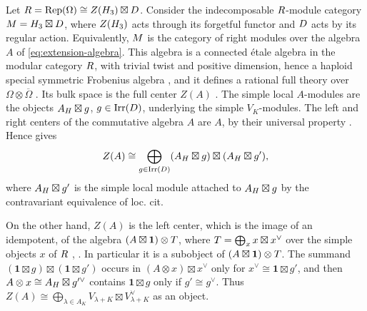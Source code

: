\documentclass[leqno]{article}
\let\cal\relax
\newcommand{\cal}{\mathcal}
\newcommand{\ot}{\otimes}
\DeclareMathOperator{\Irr}{Irr}
\DeclareMathOperator{\Rep}{Rep}
\numberwithin{equation}{section}
\begin{document}
Let $\cal R = \Rep(\Omega) \cong Z(\cal H_3) \boxtimes \cal D$. Consider the indecomposable $\cal R$-module category $\cal M = \cal H_3 \boxtimes \cal D$, where $Z(\cal H_3)$ acts through its forgetful functor \cite[Proposition 2.2(1) p.~10]{Arh26b} and $\cal D$ acts by its regular action. Equivalently, $\cal M$ is the category of right modules over the algebra $A$ of \eqref{eq:extension-algebra}. This algebra is a connected étale algebra in the modular category $\cal R$, with trivial twist and positive dimension, hence a haploid special symmetric Frobenius algebra \cite[Section 3]{DMNO13}, and it defines a rational full theory over $\Omega \ot \overline\Omega$ \cite{FRS02}. Its bulk space is the full center $Z(A)$ \cite{KoR08}. The simple local $A$-modules are the objects $\cal A_{\cal H}\boxtimes g$, $g \in \Irr(\cal D)$, underlying the simple $V_K$-modules. The left and right centers of the commutative algebra $A$ are $A$, by their universal property \cite[Section 2.4 p.~1327]{Dav10}. Hence \cite[Theorem 2.5.1 p.~1328]{Dav10} gives
\[
Z(A) \cong \bigoplus_{g \in \Irr(\cal D)}(\cal A_{\cal H}\boxtimes g)\boxtimes(\cal A_{\cal H}\boxtimes g'),
\]
where $\cal A_{\cal H}\boxtimes g'$ is the simple local module attached to $\cal A_{\cal H}\boxtimes g$ by the contravariant equivalence of loc. cit.

On the other hand, $Z(A)$ is the left center, which is the image of an idempotent, of the algebra $(A\boxtimes\mathbf1)\ot\cal T$, where $\cal T = \bigoplus_x x\boxtimes x^\vee$ over the simple objects $x$ of $\cal R$ \cite[Definitions 2.4 and 2.6]{KoR08}, \cite[Section 2.4 p.~1327]{Dav10}. In particular it is a subobject of $(A\boxtimes\mathbf1)\ot\cal T$. The summand $(\mathbf1\boxtimes g)\boxtimes(\mathbf1\boxtimes g')$ occurs in $(A\ot x)\boxtimes x^\vee$ only for $x^\vee \cong \mathbf1\boxtimes g'$, and then $A\ot x \cong \cal A_{\cal H}\boxtimes g'^\vee$ contains $\mathbf1\boxtimes g$ only if $g' \cong g^\vee$. Thus $Z(A) \cong \bigoplus_{\lambda \in A_K}V_{\lambda+K}\boxtimes V_{\lambda+K}^\vee$ as an object.
\end{document}
